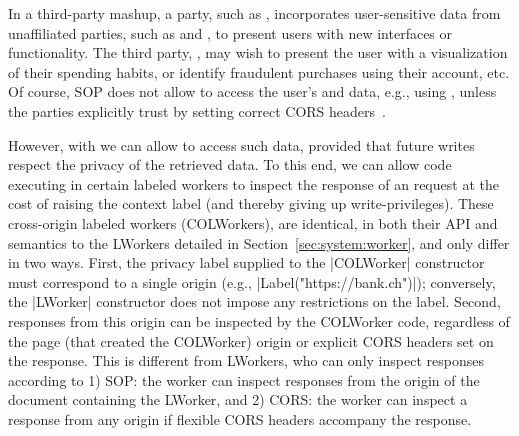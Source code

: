 In a third-party mashup, a party, such as ,
incorporates user-sensitive data from unaffiliated parties, such as
 and , to present users with new
interfaces or functionality.
%
The third party, , may wish to present the user with a
visualization of their spending habits, or identify fraudulent
 purchases using their  account, etc.
%
Of course, SOP does not allow  to access the user's
 and data, e.g., using \xhr{}, unless
the parties explicitly trust  by setting correct CORS
headers~.

However, with \sys{} we can allow  to access such data,
provided that future writes respect the privacy of the retrieved data.
%
To this end, we can allow code executing in certain labeled workers to
inspect the response of an \xhr{} request at the cost of raising the
context label (and thereby giving up write-privileges).
%
These cross-origin labeled workers (COLWorkers), are identical, in
both their API and semantics to the LWorkers detailed in
Section~\ref{sec:system:worker}, and only differ in two ways.
%
First, the privacy label supplied to the \js|COLWorker| constructor
must correspond to a single origin (e.g.,
\js|Label("https://bank.ch")|); conversely, the \js|LWorker|
constructor does not impose any restrictions on the label.
%
Second, \xhr{} responses from this origin can be inspected by the
COLWorker code, regardless of the page (that created the COLWorker)
origin or explicit CORS headers set on the response.
%
This is different from LWorkers, who can only inspect \xhr{} responses
according to 1) SOP: the worker can inspect responses from the origin
of the document containing the LWorker, and 2) CORS: the worker can
inspect a response from any origin if flexible CORS headers accompany
the response.
